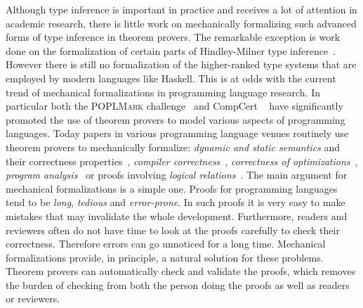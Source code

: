 Although type inference is important in practice and receives a lot of
attention in
academic research, there is little work on mechanically formalizing
such advanced forms of type inference in theorem provers.
The remarkable exception is work done on the formalization of 
certain parts of Hindley-Milner type inference~\cite{naraschewski1999type,
dubois2000proving,dubois1999certification,urban2008nominal,
garrigue2015certified}. However
there is still no formalization of the higher-ranked type systems
that are employed by modern languages like Haskell.
This is at
odds with the current trend of mechanical formalizations in
programming language research. In particular both the \textsc{POPLMark}
challenge~\cite{aydemir2005mechanized} and
CompCert ~\cite{leroy2012compcert} have significantly promoted
the use of theorem provers to model various aspects of programming
languages. Today papers in various programming language venues routinely
use theorem provers to mechanically formalize: \emph{dynamic and
  static semantics} and their correctness properties~\cite{aydemir2008engineering},
\emph{compiler correctness}~\cite{leroy2012compcert}, \emph{correctness of
  optimizations}~\cite{Bertot04}, \emph{program analysis}~\cite{Chang2006}
or proofs involving \emph{logical relations}~\cite{abel2018}. The
main argument for mechanical formalizations is a simple one. Proofs
for programming languages tend to be \emph{long}, \emph{tedious} and
\emph{error-prone}. In such proofs it is very easy to make mistakes
that may invalidate the whole development. Furthermore, readers and
reviewers often do not have time to look at the proofs carefully to
check their correctness. Therefore errors can go unnoticed for a
long time.  Mechanical formalizations provide, in principle, a natural
solution for these problems. Theorem provers can automatically check and
validate the proofs, which removes the burden of checking from both
the person doing the proofs as well as readers or reviewers.



